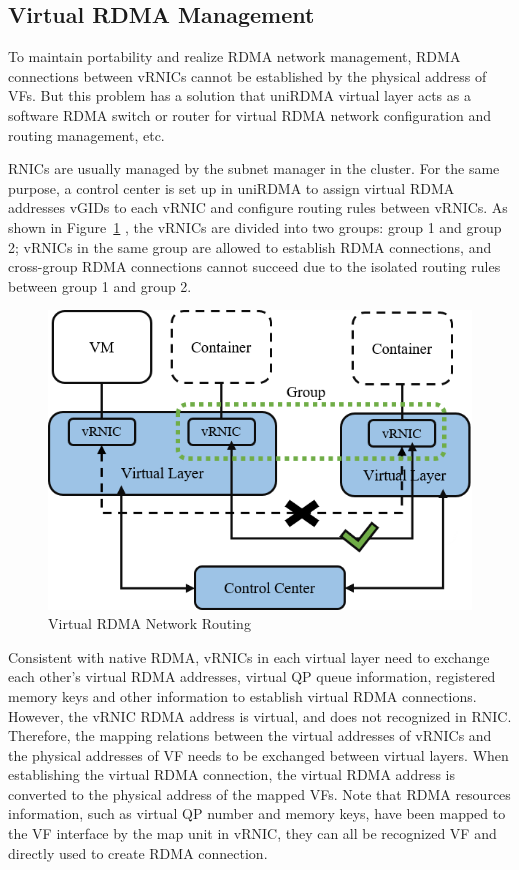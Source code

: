 \subsection{Virtual RDMA Management}
To maintain portability and realize RDMA network management, RDMA connections between vRNICs cannot be established by the physical address of VFs. But this problem has a solution that uniRDMA virtual layer acts as a software RDMA switch or router for virtual RDMA network configuration and routing management, etc.

RNICs are usually managed by the subnet manager in the cluster. For the same purpose, a control center is set up in uniRDMA to assign virtual RDMA addresses vGIDs to each vRNIC and configure routing rules between vRNICs. As shown in Figure~\ref{fig:route-config} , the vRNICs are divided into two groups: group 1 and group 2; vRNICs in the same group are allowed to establish RDMA connections, and cross-group RDMA connections cannot succeed due to the isolated routing rules between group 1 and group 2.

\begin{figure}[!ht]
	\centering
	\includegraphics[width=1.0\linewidth]{images/route-config}
	\caption{Virtual RDMA Network Routing}
	\label{fig:route-config}
\end{figure}

Consistent with native RDMA, vRNICs in each virtual layer need to exchange each other's virtual RDMA addresses, virtual QP queue information, registered memory keys and other information to establish virtual RDMA connections. However, the vRNIC RDMA address is virtual, and does not recognized in RNIC. Therefore, the mapping relations between the virtual addresses of vRNICs and the physical addresses of VF needs to be exchanged between virtual layers. When establishing the virtual RDMA connection, the virtual RDMA address is converted to the physical address of the mapped VFs. Note that RDMA resources information, such as virtual QP number and memory keys, have been mapped to the VF interface by the map unit in vRNIC, they can all be recognized VF and directly used to create RDMA connection.

